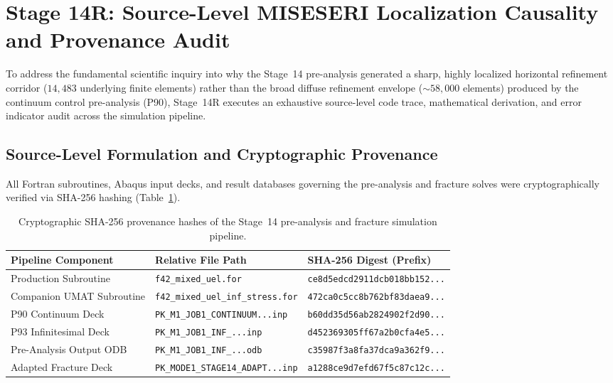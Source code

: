 \section{Stage 14R: Source-Level MISESERI Localization Causality and Provenance Audit}
\label{sec:stage14r_miseseri_causality}

To address the fundamental scientific inquiry into why the Stage~14 pre-analysis generated a sharp, highly localized horizontal refinement corridor ($14,483$ underlying finite elements) rather than the broad diffuse refinement envelope (${\sim}58,000$ elements) produced by the continuum control pre-analysis (P90), Stage~14R executes an exhaustive source-level code trace, mathematical derivation, and error indicator audit across the simulation pipeline.

\subsection{Source-Level Formulation and Cryptographic Provenance}
\label{subsec:stage14r_provenance}

All Fortran subroutines, Abaqus input decks, and result databases governing the pre-analysis and fracture solves were cryptographically verified via SHA-256 hashing (Table~\ref{tab:stage14r_provenance_hashes}).

\begin{table}[htbp]
\centering
\small
\caption{Cryptographic SHA-256 provenance hashes of the Stage~14 pre-analysis and fracture simulation pipeline.}
\label{tab:stage14r_provenance_hashes}
\begin{tabularx}{\textwidth}{p{3.8cm} p{5.2cm} X}
\toprule
\textbf{Pipeline Component} & \textbf{Relative File Path} & \textbf{SHA-256 Digest (Prefix)} \\
\midrule
Production Subroutine & \texttt{f42\_mixed\_uel.for} & \texttt{ce8d5edcd2911dcb018bb152...} \\
Companion UMAT Subroutine & \texttt{f42\_mixed\_uel\_inf\_stress.for} & \texttt{472ca0c5cc8b762bf83daea9...} \\
P90 Continuum Deck & \texttt{PK\_M1\_JOB1\_CONTINUUM...inp} & \texttt{b60dd35d56ab2824902f2d90...} \\
P93 Infinitesimal Deck & \texttt{PK\_M1\_JOB1\_INF\_...inp} & \texttt{d452369305ff67a2b0cfa4e5...} \\
Pre-Analysis Output ODB & \texttt{PK\_M1\_JOB1\_INF\_...odb} & \texttt{c35987f3a8fa37dca9a362f9...}\footnotemark \\
Adapted Fracture Deck & \texttt{PK\_MODE1\_STAGE14\_ADAPT...inp} & \texttt{a1288ce9d7efd67f5c87c12c...} \\
\bottomrule
\end{tabularx}
\end{table}

